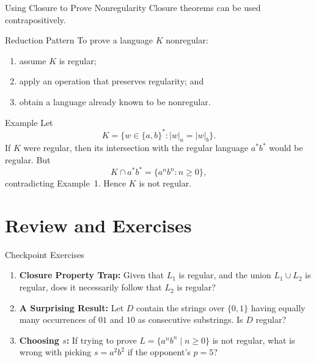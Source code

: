 \documentclass[10pt]{beamer}
\begin{document}
\begin{frame}{Using Closure to Prove Nonregularity}
  \small
  Closure theorems can be used contrapositively.
  \begin{block}{Reduction Pattern}
    To prove a language $K$ nonregular:
    \begin{enumerate}
      \item assume $K$ is regular;
      \item apply an operation that preserves regularity; and
      \item obtain a language already known to be nonregular.
    \end{enumerate}
  \end{block}
  \pause
  \begin{exampleblock}{Example}
    Let
    \[
      K=\{w\in\{a,b\}^{*}:|w|_a=|w|_b\}.
    \]
    If $K$ were regular, then its intersection with the regular language
    $a^{*}b^{*}$ would be regular. But
    \[
      K\cap a^{*}b^{*}=\{a^n b^n:n\geq0\},
    \]
    contradicting Example~1. Hence $K$ is not regular.
  \end{exampleblock}
\end{frame}

\section{Review and Exercises}

\begin{frame}{Checkpoint Exercises}
  \small
  \begin{enumerate}
      \item \textbf{Closure Property Trap:} Given that $L_1$ is regular, and the union $L_1 \cup L_2$ is regular, does it necessarily follow that $L_2$ is regular?
      \pause
      \vspace{0.4cm}
      \item \textbf{A Surprising Result:} Let $D$ contain the strings over
        $\{0,1\}$ having equally many occurrences of $01$ and $10$ as
        consecutive substrings. Is $D$ regular?
      \pause
      \vspace{0.4cm}
      \item \textbf{Choosing $s$:} If trying to prove $L = \{a^n b^n \mid n \geq 0\}$ is not regular, what is wrong with picking $s = a^2 b^2$ if the opponent's $p=5$?
  \end{enumerate}
\end{frame}
\end{document}
